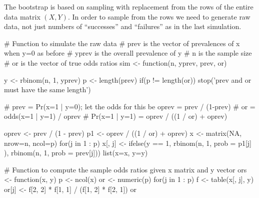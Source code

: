 The bootstrap is based on sampling with replacement from the rows of the entire 
data matrix $(X, Y)$.  In order to sample from the rows we need to generate raw 
data, not just numbers of ``successes'' and ``failures'' as in the last 
simulation.

\begin{Schunk}
\begin{Sinput}
# Function to simulate the raw data
# prev is the vector of prevalences of x when y=0 as before
# yprev is the overall prevalence of y
# n is the sample size
# or is the vector of true odds ratios
sim <- function(n, yprev, prev, or) {
  y <- rbinom(n, 1, yprev)
  p <- length(prev)
  if(p != length(or)) stop('prev and or must have the same length')

  # prev = Pr(x=1 | y=0); let the odds for this be oprev = prev / (1-prev)
  # or = odds(x=1 | y=1) / oprev
  # Pr(x=1 | y=1) = oprev / ((1 / or) + oprev)

  oprev <- prev / (1 - prev)
  p1 <- oprev / ((1 / or) + oprev)
  x <- matrix(NA, nrow=n, ncol=p)
  for(j in 1 : p) 
  	x[, j] <- ifelse(y == 1, rbinom(n, 1, prob = p1[j]  ), 
                             rbinom(n, 1, prob = prev[j]))
  list(x=x, y=y)
}
  
# Function to compute the sample odds ratios given x matrix and y vector
ors <- function(x, y) {
  p <- ncol(x)
  or <- numeric(p)
  for(j in 1 : p) {
    f <- table(x[, j], y)
    or[j] <- f[2, 2] * f[1, 1] / (f[1, 2] * f[2, 1])
  }
  or
}
\end{Sinput}
\end{Schunk}
      
